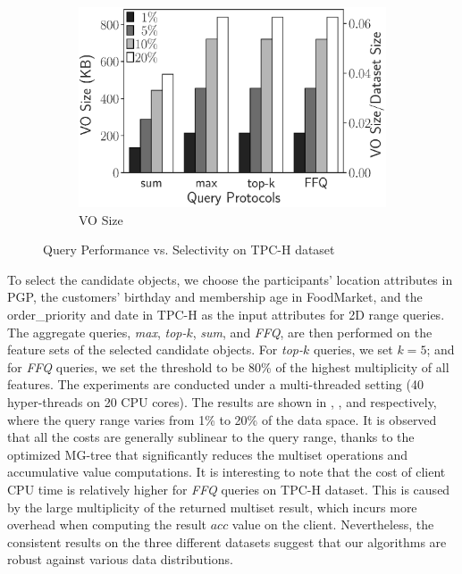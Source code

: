 \begin{figure}[t]
\begin{subfigure}[b]{.36\linewidth}
    \includegraphics[width=\linewidth]{exp-figs/aggregate-queries/tpch_vo.eps}
    \caption{VO Size}
  \end{subfigure}
  \caption{Query Performance vs. Selectivity on TPC-H dataset}\label{fig:aggregate-queries:tpch}
\end{figure}

To select the candidate objects, we choose the participants' location attributes in PGP, the customers' birthday and membership age in FoodMarket, and the order\_priority and date in TPC-H as the input attributes for 2D range queries. The aggregate queries, \emph{max}, \emph{top-$k$}, \emph{sum}, and \emph{FFQ}, are then performed on the feature sets of the selected candidate objects. For \emph{top-$k$} queries, we set $k=5$; and for \emph{FFQ} queries, we set the threshold to be 80\% of the highest multiplicity of all features. The experiments are conducted under a multi-threaded setting (40 hyper-threads on 20 CPU cores). The results are shown in , , and  respectively, where the query range varies from 1\% to 20\% of the data space. It is observed that all the costs are generally sublinear to the query range, thanks to the optimized MG-tree that significantly reduces the multiset operations and accumulative value computations.
It is interesting to note that the cost of client CPU time is relatively higher for \emph{FFQ} queries on TPC-H dataset. This is caused by the large multiplicity of the returned multiset result, which incurs more overhead when computing the result $acc$ value on the client.
Nevertheless, the consistent results on the three different datasets suggest that our algorithms are robust against various data distributions.

